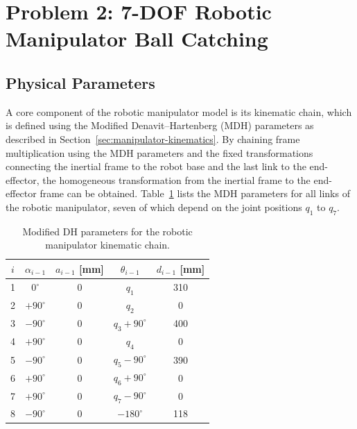\section{Problem 2: 7-DOF Robotic Manipulator Ball Catching}
\label{sec:setup_robot}

\subsection{Physical Parameters}

A core component of the robotic manipulator model is its kinematic chain, which is defined using the Modified Denavit--Hartenberg (\ac{MDH}) parameters as described in Section~\ref{sec:manipulator-kinematics}. 
By chaining frame multiplication using the \ac{MDH} parameters and the fixed transformations connecting the inertial frame to the robot base and the last link to the end-effector, the homogeneous transformation from the inertial frame to the end-effector frame can be obtained.
Table~\ref{tab:MDH_parameters} lists the \ac{MDH} parameters for all links of the robotic manipulator, seven of which depend on the joint positions $q_1$ to $q_7$.

\begin{table}[htbp]
\centering
\caption{Modified DH parameters for the robotic manipulator kinematic chain.}
\begin{tabular}{c c c c c}
\hline
\label{tab:MDH_parameters}
$i$ &
$\alpha_{i-1}$ &
$a_{i-1}$ [mm] &
$\theta_{i-1}$ &
$d_{i-1}$ [mm] \\
\hline
1 & $0^\circ$    & 0 & $q_1$              & 310 \\
2 & $+90^\circ$  & 0 & $q_2$              & 0   \\
3 & $-90^\circ$  & 0 & $q_3 + 90^\circ$   & 400 \\
4 & $+90^\circ$  & 0 & $q_4$              & 0   \\
5 & $-90^\circ$  & 0 & $q_5 - 90^\circ$   & 390 \\
6 & $+90^\circ$  & 0 & $q_6 + 90^\circ$   & 0   \\
7 & $+90^\circ$  & 0 & $q_7 - 90^\circ$   & 0   \\
8 & $-90^\circ$ & 0 & $-180^\circ$       & 118 \\
\hline
\end{tabular}
\end{table}

